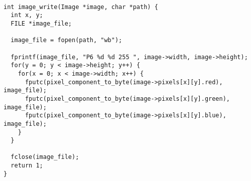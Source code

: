 \begin{lstlisting}[style=Cstyle, caption=light struct]

int image_write(Image *image, char *path) {
  int x, y;
  FILE *image_file;

  image_file = fopen(path, "wb");
  
  fprintf(image_file, "P6 %d %d 255 ", image->width, image->height);
  for(y = 0; y < image->height; y++) {
    for(x = 0; x < image->width; x++) {
      fputc(pixel_component_to_byte(image->pixels[x][y].red), image_file);
      fputc(pixel_component_to_byte(image->pixels[x][y].green), image_file);
      fputc(pixel_component_to_byte(image->pixels[x][y].blue), image_file);
    }
  }

  fclose(image_file);
  return 1;
}
\end{lstlisting}


